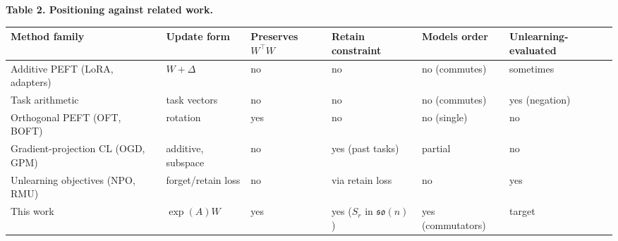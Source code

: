 \documentclass[
]{article}
\newcounter{none} %
\begin{document}
\textbf{Table 2. Positioning against related work.}

{\def\LTcaptype{none} %
\begin{longtable}[]{@{}
  >{\raggedright\arraybackslash}p{}
  >{\raggedright\arraybackslash}p{}
  >{\raggedright\arraybackslash}p{}
  >{\raggedright\arraybackslash}p{}
  >{\raggedright\arraybackslash}p{}
  >{\raggedright\arraybackslash}p{}@{}}
\toprule\noalign{}
\begin{minipage}[b]{\linewidth}\raggedright
Method family
\end{minipage} & \begin{minipage}[b]{\linewidth}\raggedright
Update form
\end{minipage} & \begin{minipage}[b]{\linewidth}\raggedright
Preserves \(W^\top W\)
\end{minipage} & \begin{minipage}[b]{\linewidth}\raggedright
Retain constraint
\end{minipage} & \begin{minipage}[b]{\linewidth}\raggedright
Models order
\end{minipage} & \begin{minipage}[b]{\linewidth}\raggedright
Unlearning-evaluated
\end{minipage} \\
\midrule\noalign{}
\endhead
\bottomrule\noalign{}
\endlastfoot
Additive PEFT (LoRA, adapters) & \(W+\Delta\) & no & no & no (commutes) & sometimes \\
Task arithmetic & task vectors & no & no & no (commutes) & yes (negation) \\
Orthogonal PEFT (OFT, BOFT) & rotation & yes & no & no (single) & no \\
Gradient-projection CL (OGD, GPM) & additive, subspace & no & yes (past tasks) & partial & no \\
Unlearning objectives (NPO, RMU) & forget/retain loss & no & via retain loss & no & yes \\
This work & \(\exp(A)W\) & yes & yes (\(S_r\) in \(\mathfrak{so}(n)\)) & yes (commutators) & target \\
\end{longtable}
}
\end{document}
